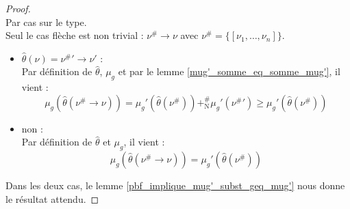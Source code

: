 \documentclass[a4paper]{report}
\newenvironment{preuve} 
  {\begin{proof}~\\} 
  {\end{proof}}
\theoremstyle{definition}
\newcommand{\mset}[1]{\{\![#1]\!\}}
\newcommand{\N}{\mathrm{N}}
\begin{document}
\begin{preuve}
  Par cas sur le type. \\
  Seul le cas flèche est non trivial : $\nu^\# \rightarrow \nu$ avec $\nu^\# = \mset{\nu_1, \dots, \nu_n}$.
  \begin{itemize}[label={\textbf{Si}}]
    \item
      $\hat\theta (\nu) = {\nu^\#}' \rightarrow \nu'$ : \\
      Par définition de $\hat\theta$, $\mu_g$ et par le lemme \ref{mug'_somme_eq_somme_mug'}, il vient :
      \[ \mu_g (\hat\theta (\nu^\# \rightarrow \nu)) = \mu_g' (\hat\theta (\nu^\#)) +^\#_\N \mu_g' ({\nu^\#}') \geqslant \mu_g' (\hat\theta (\nu^\#)) \]
    \item
      non : \\
      Par définition de $\hat\theta$ et $\mu_g$, il vient :
      \[ \mu_g (\hat\theta (\nu^\# \rightarrow \nu)) = \mu_g' (\hat\theta (\nu^\#)) \]
  \end{itemize}
  Dans les deux cas, le lemme \ref{pbf_implique_mug'_subst_geq_mug'} nous donne le résultat attendu.
\end{preuve}


\printbibliography
\end{document}
